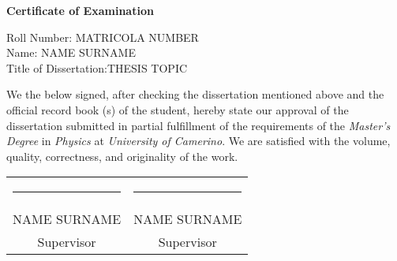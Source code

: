 \documentclass{report}
\begin{document}
\newpage
\thispagestyle{empty}
\begin{center}
\vspace*{1cm}
\huge{\textbf{Certificate of Examination}}
\end{center}
\vspace*{0.1cm}
\begin{flushleft}
\Large{Roll Number: MATRICOLA NUMBER\\
Name: NAME SURNAME\\
Title of Dissertation:THESIS TOPIC}
\end{flushleft}
\vspace*{0.3cm}
\Large{We the below signed, after checking the dissertation mentioned above and the official record book (s) of the student, hereby state our approval of the dissertation submitted in partial fulfillment of the requirements of the \textit{Master's Degree} in \textit{Physics} at \textit{University of Camerino}. We are satisfied with the volume, quality, correctness, and originality of the work.}
\vspace*{0.5cm}
\renewcommand{\arraystretch}{0.5}
\setlength{\tabcolsep}{30pt}
\begin{center}
\begin{tabular}{c c}
\par\noindent\rule{6cm}{0.4pt} & \par\noindent\rule{6cm}{0.4pt}\\
\LARGE{NAME SURNAME} & \LARGE{NAME SURNAME}\\
\Large{Supervisor}  & \Large{Supervisor}
\end{tabular}
\end{center}
\end{document}

